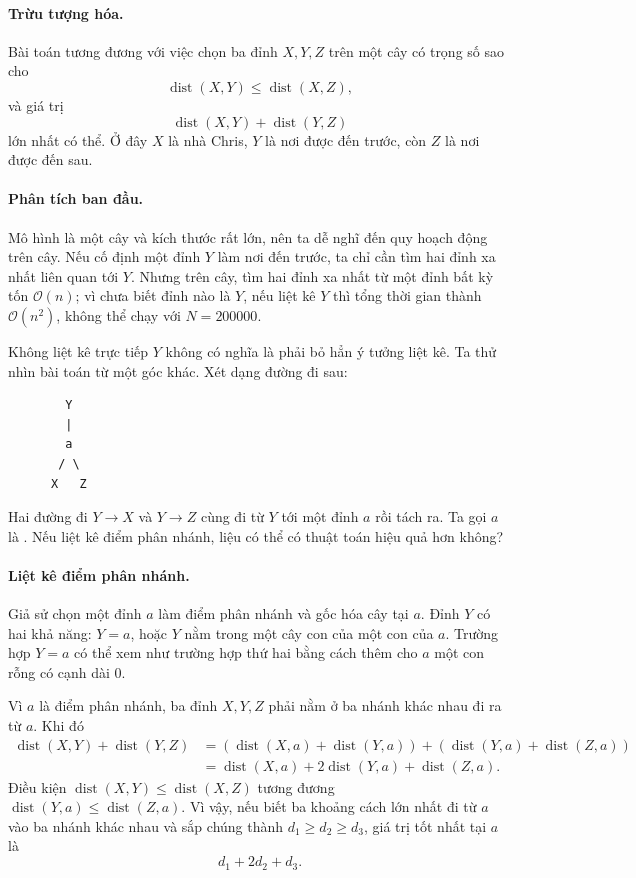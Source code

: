\documentclass[11pt]{article}
\newcommand{\Oh}{\mathcal{O}}
\newcommand{\dist}{\operatorname{dist}}
\begin{document}
\paragraph{Trừu tượng hóa.}
Bài toán tương đương với việc chọn ba đỉnh \(X,Y,Z\) trên một cây có trọng số
sao cho
\[
  \dist(X,Y)\le \dist(X,Z),
\]
và giá trị
\[
  \dist(X,Y)+\dist(Y,Z)
\]
lớn nhất có thể. Ở đây \(X\) là nhà Chris, \(Y\) là nơi được đến trước, còn
\(Z\) là nơi được đến sau.

\paragraph{Phân tích ban đầu.}
Mô hình là một cây và kích thước rất lớn, nên ta dễ nghĩ đến quy hoạch động
trên cây. Nếu cố định một đỉnh \(Y\) làm nơi đến trước, ta chỉ cần tìm hai
đỉnh xa nhất liên quan tới \(Y\). Nhưng trên cây, tìm hai đỉnh xa nhất từ một
đỉnh bất kỳ tốn \(\Oh(n)\); vì chưa biết đỉnh nào là \(Y\), nếu liệt kê
\(Y\) thì tổng thời gian thành \(\Oh(n^2)\), không thể chạy với
\(N=200000\).

Không liệt kê trực tiếp \(Y\) không có nghĩa là phải bỏ hẳn ý tưởng liệt kê.
Ta thử nhìn bài toán từ một góc khác. Xét dạng đường đi sau:

\begin{verbatim}
        Y
        |
        a
       / \
      X   Z
\end{verbatim}

Hai đường đi \(Y\to X\) và \(Y\to Z\) cùng đi từ \(Y\) tới một đỉnh \(a\) rồi
tách ra. Ta gọi \(a\) là \term{điểm phân nhánh}. Nếu liệt kê điểm phân nhánh,
liệu có thể có thuật toán hiệu quả hơn không?

\paragraph{Liệt kê điểm phân nhánh.}
Giả sử chọn một đỉnh \(a\) làm điểm phân nhánh và gốc hóa cây tại \(a\). Đỉnh
\(Y\) có hai khả năng: \(Y=a\), hoặc \(Y\) nằm trong một cây con của một con
của \(a\). Trường hợp \(Y=a\) có thể xem như trường hợp thứ hai bằng cách thêm
cho \(a\) một con rỗng có cạnh dài \(0\).

Vì \(a\) là điểm phân nhánh, ba đỉnh \(X,Y,Z\) phải nằm ở ba nhánh khác nhau
đi ra từ \(a\). Khi đó
\[
  \begin{aligned}
  \dist(X,Y)+\dist(Y,Z)
  &=(\dist(X,a)+\dist(Y,a))+(\dist(Y,a)+\dist(Z,a))\\
  &=\dist(X,a)+2\dist(Y,a)+\dist(Z,a).
  \end{aligned}
\]
Điều kiện \(\dist(X,Y)\le\dist(X,Z)\) tương đương
\(\dist(Y,a)\le\dist(Z,a)\). Vì vậy, nếu biết ba khoảng cách lớn nhất đi từ
\(a\) vào ba nhánh khác nhau và sắp chúng thành
\(d_1\ge d_2\ge d_3\), giá trị tốt nhất tại \(a\) là
\[
  d_1+2d_2+d_3.
\]
\end{document}
